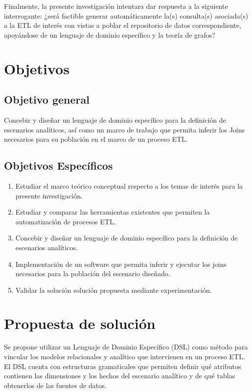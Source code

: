 Finalmente, la presente investigación intentara dar respuesta a la siguiente interrogante: ¿será factible generar 
automáticamente la(s) consulta(s) asociada(s) a la ETL de interés con vistas a poblar el repositorio de datos 
correspondiente, apoy\'andose de un lenguaje de dominio espec\'ifico y la teor\'ia de grafos?

\section{Objetivos}

\subsection{Objetivo general}

Concebir y diseñar un lenguaje de dominio específico para la definici\'on de escenarios analíticos, as\'i como un marco de trabajo que permita 
inferir los Joins necesarios para su población en el marco de un proceso ETL.

\subsection{Objetivos Espec\'ificos}

\begin{enumerate}
    \item Estudiar el marco te\'orico conceptual respecto a los temas de inter\'es para la presente investigación. 
    \item Estudiar y comparar las herramientas existentes que permiten la automatización de procesos ETL.
    \item Concebir y diseñar un lenguaje de dominio específico para la definici\'on de escenarios analíticos.
    \item Implementación de un software que permita inferir y ejecutar los joins necesarios para la población del escenario diseñado.
    \item Validar la solución solución propuesta mediante experimentación.
\end{enumerate}

\section{Propuesta de soluci\'on}

Se propone utilizar un Lenguaje de Dominio Específico (DSL) como método para vincular los modelos relacionales y analítico
que intervienen en un proceso ETL. El DSL cuenta con estructuras gramaticales que permiten definir qu\'e atributos 
contienen las dimensiones y los hechos del escenario analítico y de qu\'e tablas obtenerlos de las fuentes de datos.


